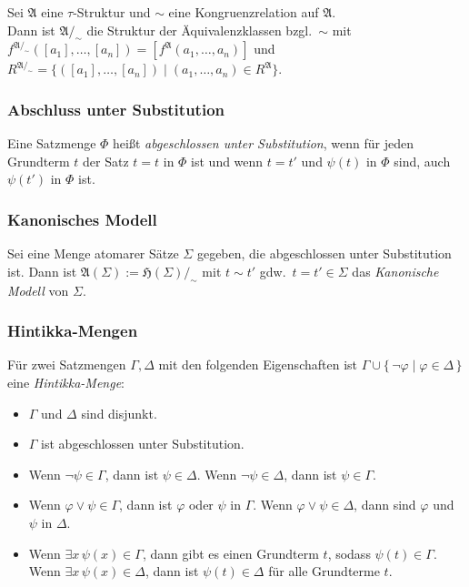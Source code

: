 \documentclass{panikzettel}
\newcommand{\A}{\mathfrak{A}}
\newcommand{\He}{\mathfrak{H}}
\begin{document}
Sei $\A$ eine $\tau$-Struktur und $\sim$ eine Kongruenzrelation auf $\A$.   \\
Dann ist $\A /_{\sim}$ die Struktur der Äquivalenzklassen bzgl.\ $\sim$ mit $f^{\A /_{\sim}}([a_1],\ldots, [a_n]) = [f^\A(a_1,\ldots,a_n)]$ und $R^{\A/_{\sim}} = \{([a_1],\ldots,[a_n]) \;|\; (a_1,\ldots,a_n) \in R^\A\}$.

\subsubsection{Abschluss unter Substitution}

Eine Satzmenge $\Phi$ heißt \emph{abgeschlossen unter Substitution}, wenn für jeden Grundterm $t$ der Satz $t = t$ in $\Phi$ ist und wenn $t = t'$ und $\psi(t)$ in $\Phi$ sind, auch $\psi(t')$ in $\Phi$ ist.

\subsubsection{Kanonisches Modell}

Sei eine Menge atomarer Sätze $\Sigma$ gegeben, die abgeschlossen unter Substitution ist. Dann ist $\A(\Sigma) := \He(\Sigma)/_{\sim}$ mit $t \sim t'$ gdw.\ $t = t' \in \Sigma$ das \emph{Kanonische Modell} von $\Sigma$.

\subsubsection{Hintikka-Mengen}

Für zwei Satzmengen $\Gamma, \Delta$ mit den folgenden Eigenschaften ist $\Gamma \cup \{\,\neg \varphi \;|\; \varphi \in \Delta\,\}$ eine \emph{Hintikka-Menge}:
\begin{itemize}
\item $\Gamma$ und $\Delta$ sind disjunkt.
\item $\Gamma$ ist abgeschlossen unter Substitution.
\item Wenn $\neg \psi \in \Gamma$, dann ist $\psi \in \Delta$. Wenn $\neg \psi \in \Delta$, dann ist $\psi \in \Gamma$.
\item Wenn $\varphi \lor \psi \in \Gamma$, dann ist $\varphi$ oder $\psi$ in $\Gamma$. Wenn $\varphi \lor \psi \in \Delta$, dann sind $\varphi$ und $\psi$ in $\Delta$.
\item Wenn $\exists x\, \psi(x) \in \Gamma$, dann gibt es einen Grundterm $t$, sodass $\psi(t) \in \Gamma$. Wenn $\exists x\, \psi(x) \in \Delta$, dann ist $\psi(t) \in \Delta$ für alle Grundterme $t$.
\end{itemize}
\end{document}
